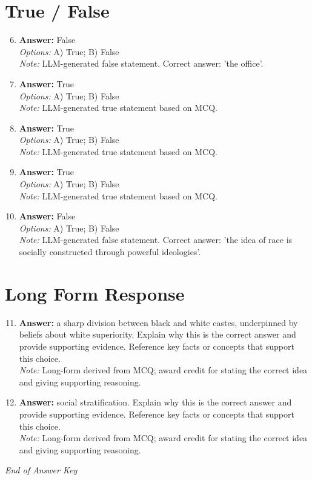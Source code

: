 \documentclass[12pt]{article}
\begin{document}
\section*{True / False}
\begin{enumerate}[label=\arabic*.]
\setcounter{enumi}{5}
\item \textbf{Answer:} False
\\ \textit{Options:} A) True; B) False
\\ \textit{Note:} LLM-generated false statement. Correct answer: 'the office'.
\item \textbf{Answer:} True
\\ \textit{Options:} A) True; B) False
\\ \textit{Note:} LLM-generated true statement based on MCQ.
\item \textbf{Answer:} True
\\ \textit{Options:} A) True; B) False
\\ \textit{Note:} LLM-generated true statement based on MCQ.
\item \textbf{Answer:} True
\\ \textit{Options:} A) True; B) False
\\ \textit{Note:} LLM-generated true statement based on MCQ.
\item \textbf{Answer:} False
\\ \textit{Options:} A) True; B) False
\\ \textit{Note:} LLM-generated false statement. Correct answer: 'the idea of race is socially constructed through powerful ideologies'.
\end{enumerate}

\section*{Long Form Response}
\begin{enumerate}[label=\arabic*.]
\setcounter{enumi}{10}
\item \textbf{Answer:} a sharp division between black and white castes, underpinned by beliefs about white superiority. Explain why this is the correct answer and provide supporting evidence. Reference key facts or concepts that support this choice.
\\ \textit{Note:} Long-form derived from MCQ; award credit for stating the correct idea and giving supporting reasoning.
\item \textbf{Answer:} social stratification. Explain why this is the correct answer and provide supporting evidence. Reference key facts or concepts that support this choice.
\\ \textit{Note:} Long-form derived from MCQ; award credit for stating the correct idea and giving supporting reasoning.
\end{enumerate}

\vfill
\noindent\textit{End of Answer Key}
\end{document}
